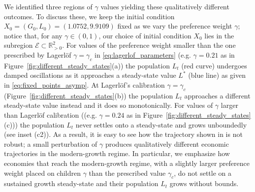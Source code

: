 \documentclass[a4paper,fleqn]{cas-sc}
\begin{document}
We identified three regions of $\gamma$ values yielding these qualitatively different outcomes.
To discuss these, we keep the initial condition $X_0=(G_0,L_0)=(1.0752,9.9109)$ fixed as we vary the preference weight $\gamma$; notice that, for any $\gamma\in(0,1)$, our choice of initial condition $X_0$ lies in the subregion $\mathcal E\subset\mathbb{R}^2_{>0}$.
For values of the preference weight smaller than the one prescribed by Lagerl\"{o}f $\gamma=\gamma_c$ in \eqref{eq:lagerlof_parameters} (e.g. $\gamma=0.21$ as in Figure~\ref{fig:different_steady_states}(a)) the population $L_t$ (red curve) undergoes damped oscillations as it approaches a steady-state value $L^*$ (blue line) as given in \eqref{eq:fixed_points_asymp}.
At Lagerl\"{o}f's calibration $\gamma=\gamma_c$ (Figure~\ref{fig:different_steady_states}(b)) the population $L_t$ approaches a different steady-state value instead and it does so monotonically.
For values of $\gamma$ larger than Lagerl\"{o}f calibration ((e.g. $\gamma=0.24$ as in Figure~\ref{fig:different_steady_states}(c))) the population $L_t$ never settles onto a steady-state and grows unboundedly (see inset (c2)).
As a result, it is easy to see how the trajectory shown in \citet{Lagerlof2006} is not robust; a small perturbation of $\gamma$ produces qualitatively different economic trajectories in the modern-growth regime.
In particular, we emphasize how economies that reach the modern-growth regime, with a slightly larger preference weight placed on children $\gamma$ than the prescribed value $\gamma_c$, do not settle on a sustained growth steady-state and their population $L_t$ grows without bounds.
\end{document}
